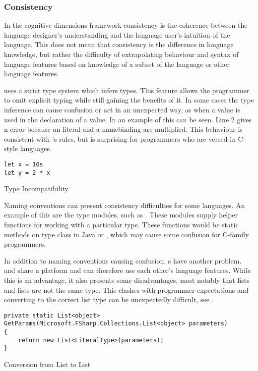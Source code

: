 \subsubsection{Consistency}
In the cognitive dimensions framework consistency is the coherence between the language designer's understanding and the language user's intuition of the language\cite{green1996usability}. This does not mean that consistency is the difference in language knowledge, but rather the difficulty of extrapolating behaviour and syntax of language features based on knowledge of a subset of the language or other language features.

\fs uses a strict type system which infers types. This feature allows the programmer to omit explicit typing while still gaining the benefits of it. In some cases the type inference can cause confusion or act in an unexpected way, as when a  value is used in the declaration of a  value. In  an example of this can be seen. Line 2 gives n error because an  literal and a  namebinding are multiplied. This behaviour is consistent with \fs's rules, but is surprising for programmers who are versed in C-style languages.

\begin{listing}[H]
\begin{verbatim}
let x = 10s
let y = 2 * x
\end{verbatim}
\caption{Type Incompatibility}
\label{lst:type-incompat}
\end{listing}

Naming conventions can present consistency difficulties for some languages. An example of this are the type modules, such as . These modules supply helper functions for working with a particular type. These functions would be static methods on type class in Java or \cs, which may cause some confusion for C-family programmers.

In addition to naming conventions causing confusion, s have another problem. \fs and \cs share a platform and can therefore use each other's language features. While this is an advantage, it also presents some disadvantages, most notably that \fs lists and \cs lists are not the same type. This clashes with programmer expectations and converting to the correct list type can be unexpectedly difficult, see .

\begin{listing}[H]
\begin{verbatim}
private static List<object> GetParams(Microsoft.FSharp.Collections.List<object> parameters)
{
    return new List<LiteralType>(parameters);
}
\end{verbatim}
\caption{Conversion from \fs List to \cs List}
\label{lst:list-conv}
\end{listing}

